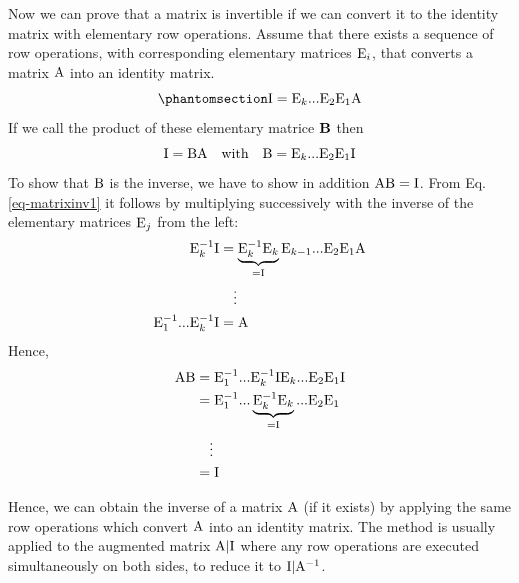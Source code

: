 \documentclass[
  a4paper,
  DIV=11,
  numbers=noendperiod,
  oneside]{scrreprt}
\theoremstyle{definition}
\theoremstyle{remark}
\begin{document}
Now we can prove that a matrix is invertible if we can convert it to the
identity matrix with elementary row operations. Assume that there exists
a sequence of row operations, with corresponding elementary matrices
\({\rm E}_i\), that converts a matrix \({\rm A}\) into an identity
matrix.
\begin{equation}\phantomsection\label{eq-matrixinv1}{ {\rm I} = {\rm E}_{k} ... {\rm E}_{2} {\rm E}_{1} {\rm A} }\end{equation}
If we call the product of these elementary matrice \({\bf B}\) then
\[{\rm I} = {\rm B}  {\rm A}  \quad \text{with} \quad  {\rm B} = {\rm E}_{k} ... {\rm E}_{2} {\rm E}_{1} {\rm I} \]
To show that \({\rm B}\) is the inverse, we have to show in addition
\({\rm A}{\rm B} = {\rm I}\). From Eq. \ref{eq-matrixinv1} it follows by
multiplying successively with the inverse of the elementary matrices
\({\rm E}_{j}\) from the left: \[\begin{aligned}
{\rm E}_{k}^{-1}{\rm I} &=\underbrace{{\rm E}_{k}^{-1}{\rm E}_{k}}_{={\rm I}} {\rm E}_{k-1} ... {\rm E}_{2} {\rm E}_{1} {\rm A} \\
& \quad \vdots  \\
 {\rm E}_{1}^{-1}... {\rm E}_{k}^{-1}{\rm I} &=  {\rm A} 
 \end{aligned}\] Ηence, \[\begin{aligned}
 {\rm A}  {\rm B} & ={\rm E}_{1}^{-1}... {\rm E}_{k}^{-1}{\rm I}  {\rm E}_{k} ... {\rm E}_{2} {\rm E}_{1} {\rm I}   \\
 & ={\rm E}_{1}^{-1}... \underbrace{{\rm E}_{k}^{-1}{\rm E}_{k}}_{={\rm I}} ... {\rm E}_{2} {\rm E}_{1} \\
 & \quad \vdots \\
 &= {\rm I}
\end{aligned}\]

Hence, we can obtain the inverse of a matrix \({\rm A}\) (if it exists)
by applying the same row operations which convert \({\rm A}\) into an
identity matrix. The method is usually applied to the augmented matrix
\({\rm A} \vert  {\rm  I}\) where any row operations are executed
simultaneously on both sides, to reduce it to
\({\rm I} \vert  {\rm A}^{-1}\).
\end{document}
